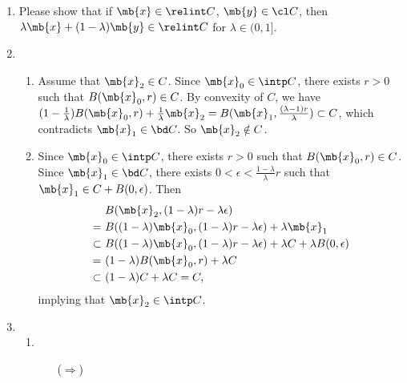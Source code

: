 \begin{exercise}
\begin{enumerate}
\begin{enumerate}
\begin{enumerate}
            \item Please show that if $\mb{x} \in \relint C$, $\mb{y} \in \cl C$, then  $\lambda \mb{x}+(1-\lambda) \mb{y} \in \relint C$ for $\lambda \in(0,1]$.
          \end{enumerate}

      \end{enumerate}
      \begin{solution}
        \begin{enumerate}
          \item []
          \item 
            \begin{enumerate}
              \item Assume that $\mb{x}_2 \in C$. Since $\mb{x}_0 \in \intp C$, there exists $r>0$ such that $B(\mb{x}_0,r) \in C$. By convexity of $C$, we have $(1 - \frac{1}{\lambda}) B(\mb{x}_0,r) + \frac{1}{\lambda} \mb{x}_2 = B(\mb{x}_1,\frac{(\lambda-1)r}{\lambda}) \subset C$, which contradicts $\mb{x}_1 \in \bd C$. So $\mb{x}_2 \notin C$.
              \item Since $\mb{x}_0 \in \intp C$, there exists $r>0$ such that $B(\mb{x}_0,r) \in C$. Since $\mb{x}_1 \in \bd C$, there exists $0< \epsilon < \frac{1-\lambda}{\lambda}r$ such that $\mb{x}_1 \in C + B(0,\epsilon)$. Then
                \begin{align*}
                            & B(\mb{x}_2,(1-\lambda) r - \lambda\epsilon)                                                \\  
                  =\        & B((1-\lambda)\mb{x}_0,(1-\lambda) r - \lambda\epsilon) +\lambda \mb{x}_1                   \\  
                  \subset\  & B((1-\lambda)\mb{x}_0,(1-\lambda) r - \lambda\epsilon) + \lambda C + \lambda B(0,\epsilon) \\
                  =\        & (1-\lambda) B(\mb{x}_0, r) + \lambda C                                                     \\
                  \subset\  & (1 - \lambda) C + \lambda C = C,
                \end{align*}implying that $\mb{x}_2 \in \intp C$.
            \end{enumerate}
          \item 
            \begin{enumerate}
              \item 
                \begin{itemize}
                  \item [($\Rightarrow$)]

\end{itemize}
\end{enumerate}
\end{enumerate}
\end{solution}
\end{enumerate}
\end{exercise}
